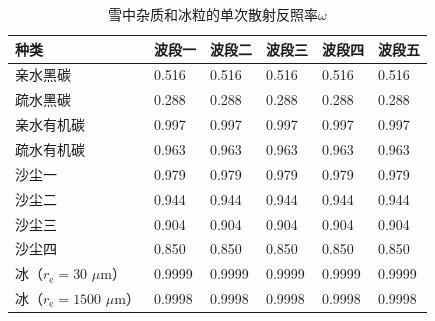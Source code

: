 \begin{table}[htbp]
  \centering
  \caption{雪中杂质和冰粒的单次散射反照率$\omega$}
  \label{tab:积雪单次散射反照率}
  \begin{tabular}{llllll}
    \toprule
    种类                                        & 波段一 & 波段二 & 波段三 & 波段四 & 波段五 \\ \midrule
    亲水黑碳                                    & 0.516  & 0.516  & 0.516  & 0.516  & 0.516  \\
    疏水黑碳                                    & 0.288  & 0.288  & 0.288  & 0.288  & 0.288  \\
    亲水有机碳                                  & 0.997  & 0.997  & 0.997  & 0.997  & 0.997  \\
    疏水有机碳                                  & 0.963  & 0.963  & 0.963  & 0.963  & 0.963  \\
    沙尘一                                      & 0.979  & 0.979  & 0.979  & 0.979  & 0.979  \\
    沙尘二                                      & 0.944  & 0.944  & 0.944  & 0.944  & 0.944  \\
    沙尘三                                      & 0.904  & 0.904  & 0.904  & 0.904  & 0.904  \\
    沙尘四                                      & 0.850  & 0.850  & 0.850  & 0.850  & 0.850  \\
    冰（$r_{\mathrm e}=30$ $\mu\mathrm{m}$）    & 0.9999 & 0.9999 & 0.9999 & 0.9999 &
    0.9999                                     \\
    冰（$r_{\mathrm e}=1500$ $\mu\mathrm{m}$）  & 0.9998 & 0.9998 & 0.9998 & 0.9998 &
    0.9998                                     \\ \bottomrule
  \end{tabular}
\end{table}

